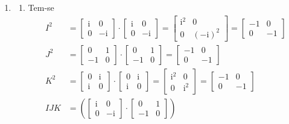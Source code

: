 \documentclass[12pt,a4paper]{article}
\newcommand\ii{\mathrm{i}}
\begin{document}
\begin{enumerate}
\item 
\begin{enumerate}
\item Tem-se
\begin{align*}
I^2
& =   \begin{bmatrix} \ii & 0 \\ 0 & -\ii \end{bmatrix}
\cdot \begin{bmatrix} \ii & 0 \\ 0 & -\ii \end{bmatrix}
= \begin{bmatrix} \ii^2 & 0 \\ 0 & (-\ii)^2 \end{bmatrix}
= \begin{bmatrix} -1 & 0 \\ 0 & -1 \end{bmatrix} \\
J^2
& =   \begin{bmatrix} 0 & 1 \\ -1 & 0 \end{bmatrix}
\cdot \begin{bmatrix} 0 & 1 \\ -1 & 0 \end{bmatrix}
= \begin{bmatrix} -1 & 0 \\ 0 & -1 \end{bmatrix} \\
K^2
& =   \begin{bmatrix} 0 & \ii \\ \ii & 0 \end{bmatrix}
\cdot \begin{bmatrix} 0 & \ii \\ \ii & 0 \end{bmatrix}
= \begin{bmatrix} \ii^2 & 0 \\ 0 & \ii^2 \end{bmatrix}
= \begin{bmatrix} -1 & 0 \\ 0 & -1 \end{bmatrix} \\
IJK
& =   \left( \begin{bmatrix} \ii & 0 \\ 0 & -\ii \end{bmatrix}
\cdot \begin{bmatrix} 0 & 1 \\ -1 & 0 \end{bmatrix} \right)

\end{align*}
\end{enumerate}
\end{enumerate}
\end{document}
